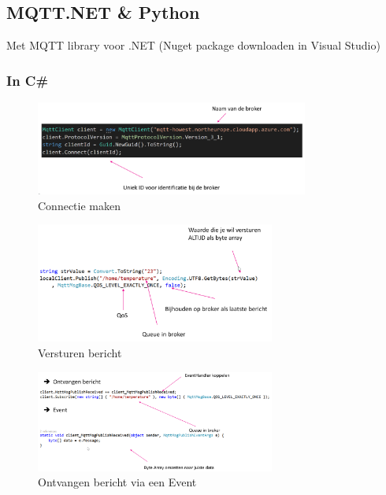 \documentclass{article}
\begin{document}
\subsection{MQTT.NET \& Python}

Met MQTT library voor .NET (Nuget package downloaden in Visual Studio)

\subsubsection{In C\#}

\begin{figure}[H]
    \centering
    \includegraphics[width=0.8\textwidth]{mqtt-net1.png}
    \caption{Connectie maken}
\end{figure}

\begin{figure}[H]
    \centering
    \includegraphics[width=0.7\textwidth]{mqtt-net2.png}
    \caption{Versturen bericht}
\end{figure}

\begin{figure}[H]
    \centering
    \includegraphics[width=0.7\textwidth]{mqtt-net3.png}
    \caption{Ontvangen bericht via een Event}
\end{figure}
\end{document}
